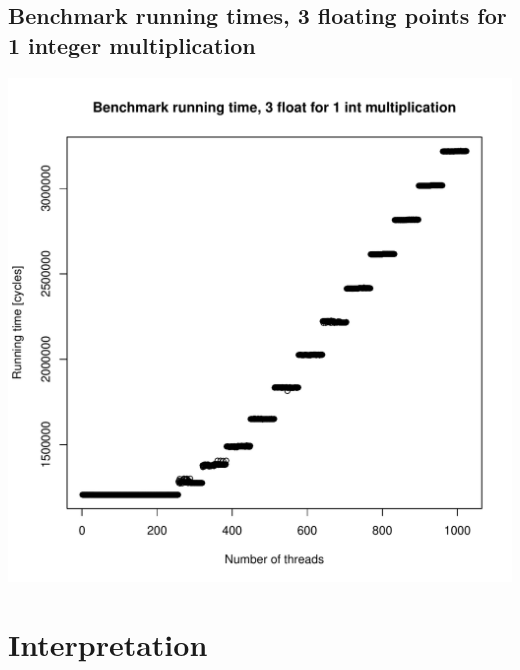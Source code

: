 \documentclass{article}
\begin{document}
	\subsection{Benchmark running times, 3 floating points for 1 integer multiplication}
	\includegraphics[width=\linewidth]{"graphics/running_times_ratio31"}
	\pagebreak

\section{Interpretation}
\end{document}

